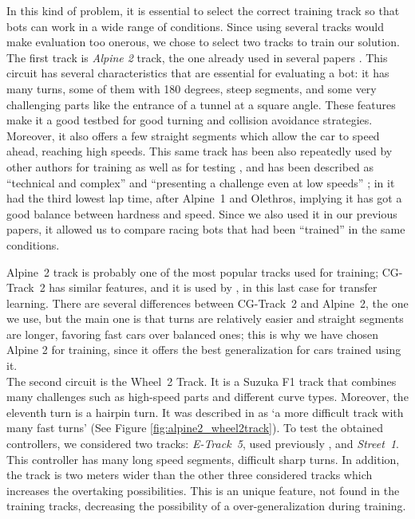 \documentclass[10pt,journal,compsoc]{IEEEtran}
\begin{document}
In this kind of problem, it is essential to select the correct
training track so that bots can work in a wide range of
conditions. Since using several tracks would make evaluation too onerous, we chose to select two tracks to train our solution. The first track is \textit{Alpine 2} track, the one already used in several papers  \cite{salem_cig2018,DBLP:conf/cig/SalemMG19}. This circuit has several characteristics that
are essential for evaluating a bot: it has many turns, some of
them with 180 degrees, steep segments, and some very challenging parts
like the entrance of a tunnel at a square angle. These features make
it a good testbed for good turning and collision avoidance
strategies. Moreover, it also offers a few straight segments which allow the car to speed ahead, reaching high speeds. This same track has been also repeatedly used by other authors for training as well as for testing \cite{cardamone2010applying}, and has been described as ``technical and complex'' \cite{AG} and ``presenting a challenge even at low speeds'' \cite{vrajitoru2018global}; in \cite{AG} it had the third lowest lap time, after \mbox{Alpine 1} and Olethros, implying it has got a good balance between hardness and speed. Since we also used it in our previous papers, it allowed us to compare racing bots that had been ``trained'' in the same conditions.

\mbox{Alpine 2} track is probably one of the most popular tracks used for
training; \mbox{CG-Track 2} has similar features, and it is used by
\cite{mirus2019short,8833873,verma2018programmatically},
in this last case for transfer learning. There are several differences between \mbox{CG-Track 2} and \mbox{Alpine 2}, the one we use, but the main one is that turns are relatively easier and straight segments are longer, favoring fast cars over balanced ones; this is why we have chosen Alpine 2 for training, since
it offers the best generalization for cars trained using it.\\
The second circuit is the \mbox{Wheel 2} Track. It is a  Suzuka F1 track that combines many challenges such as  high-speed parts and different  curve types. Moreover, the eleventh turn is a hairpin turn. It was  described in \cite{wheel2track_chen} as `a more difficult track with many fast turns' (See Figure \ref{fig:alpine2_wheel2track}).
To test the obtained controllers, we considered two tracks: \mbox{\textit{E-Track 5}}, used previously \cite{salem_evo17},\cite{salem_evo18} and  \mbox{\textit{Street 1}}.
This controller has many long speed segments, difficult sharp
turns. In addition, the track is two meters wider than the other three
considered tracks which  increases the overtaking
possibilities. This is an unique feature, not found in
  the training tracks, decreasing the possibility of a
  over-generalization during training.
\end{document}
